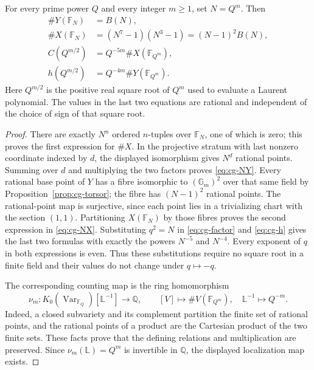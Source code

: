 \begin{theorem}\label{thm:cg-counts}
For every prime power $Q$ and every integer $m\geq1$, set $N=Q^m$.
Then
\begin{align}
 \#Y(\mathbb F_N)&=B(N),\label{eq:cg-NY}\\
 \#X(\mathbb F_N)&=(N^7-1)(N^3-1)
                =(N-1)^2B(N),\label{eq:cg-NX}\\
 C(Q^{m/2})&=Q^{-5m}\#X(\mathbb F_{Q^m}),\label{eq:cg-countC}\\
 h(Q^{m/2})&=Q^{-4m}\#Y(\mathbb F_{Q^m}).\label{eq:cg-counth}
\end{align}
Here $Q^{m/2}$ is the positive real square root of $Q^m$ used to
evaluate a Laurent polynomial. The values in the last two equations
are rational and independent of the choice of sign of that square root.
\end{theorem}
\begin{proof}
There are exactly $N^n$ ordered $n$-tuples over $\mathbb F_N$, one of
which is zero; this proves the first expression for $\#X$. In the
projective stratum with last nonzero coordinate indexed by $d$, the
displayed isomorphism gives $N^d$ rational points. Summing over $d$
and multiplying the two factors proves \eqref{eq:cg-NY}. Every rational
base point of $Y$ has a fibre isomorphic to $(\mathbb G_m)^2$ over that
same field by Proposition~\ref{prop:cg-torsor}; the fibre has
$(N-1)^2$ rational points. The rational-point map is surjective, since
each point lies in a trivializing chart with the section $(1,1)$.
Partitioning $X(\mathbb F_N)$ by those fibres proves the second
expression in \eqref{eq:cg-NX}. Substituting $q^2=N$ in
\eqref{eq:cg-factor} and \eqref{eq:cg-h} gives the last two formulas
with exactly the powers $N^{-5}$ and $N^{-4}$. Every exponent of $q$
in both expressions is even. Thus these substitutions require no square
root in a finite field and their values do not change under $q\mapsto-q$.

The corresponding counting map is the ring homomorphism
\[
 \nu_m:K_0(\operatorname{Var}_{\mathbb F_Q})[\mathbb L^{-1}]
 \longrightarrow\mathbb Q,\qquad
 [V]\longmapsto\#V(\mathbb F_{Q^m}),\quad\mathbb L^{-1}\longmapsto Q^{-m}.
\]
Indeed, a closed subvariety and its complement partition the finite set
of rational points, and the rational points of a product are the Cartesian
product of the two finite sets. These facts prove that the defining
relations and multiplication are preserved. Since $\nu_m(\mathbb L)=Q^m$
is invertible in $\mathbb Q$, the displayed localization map exists.
\end{proof}

